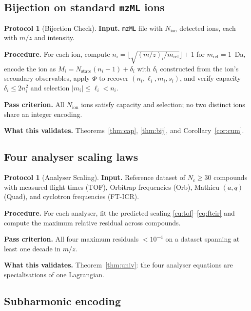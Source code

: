 \documentclass[twocolumn,10pt,a4paper]{article}
\theoremstyle{thmstyle}
\theoremstyle{definition}
\newtheorem{protocol}[theorem]{Protocol}
\theoremstyle{remark}
\newcommand{\PhiMap}{\varPhi}
\begin{document}
\subsection{Bijection on standard \texttt{mzML} ions}

\begin{protocol}[Bijection Check]
\label{prot:bij}
\textbf{Input.} \texttt{mzML} file with $N_{\mathrm{ion}}$ detected
ions, each with $m/z$ and intensity.

\textbf{Procedure.} For each ion, compute
$n_{i}=\lfloor\sqrt{(m/z)_{i}/m_{\mathrm{ref}}}\rfloor+1$ for
$m_{\mathrm{ref}}=1$~Da, encode the ion as
$M_{i}=N_{\mathrm{state}}(n_{i}-1)+\delta_{i}$ with $\delta_{i}$
constructed from the ion's secondary observables, apply $\PhiMap$ to
recover $(n_{i},\ell_{i},m_{i},s_{i})$, and verify capacity
$\delta_{i}\leq 2n_{i}^{2}$ and selection $|m_{i}|\leq\ell_{i}<n_{i}$.

\textbf{Pass criterion.} All $N_{\mathrm{ion}}$ ions satisfy capacity
and selection; no two distinct ions share an integer encoding.

\textbf{What this validates.} Theorems~\ref{thm:cap}, \ref{thm:bij},
and Corollary~\ref{cor:cum}.
\end{protocol}

\subsection{Four analyser scaling laws}

\begin{protocol}[Analyser Scaling]
\label{prot:scale}
\textbf{Input.} Reference dataset of $N_{c}\geq 30$ compounds with
measured flight times (TOF), Orbitrap frequencies (Orb), Mathieu
$(a,q)$ (Quad), and cyclotron frequencies (FT-ICR).

\textbf{Procedure.} For each analyser, fit the predicted scaling
\eqref{eq:tof}--\eqref{eq:ftcir} and compute the maximum relative
residual across compounds.

\textbf{Pass criterion.} All four maximum residuals
$<10^{-4}$ on a dataset spanning at least one decade in $m/z$.

\textbf{What this validates.} Theorem~\ref{thm:univ}: the four
analyser equations are specialisations of one Lagrangian.
\end{protocol}

\subsection{Subharmonic encoding}
\end{document}

